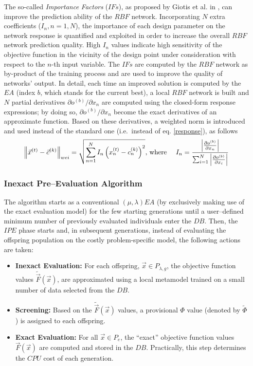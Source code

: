 The so-called \textit{Importance Factors} ($IFs$), as proposed by Giotis et al. in \cite{LTT_2_018}, can improve the prediction ability of the $RBF$ network. Incorporating $N$ extra coefficients ($I_n, n\!=\!1,N$), the importance of each design parameter on the network response is quantified and exploited in order to increase the overall $RBF$ network prediction quality. High $I_n$ values indicate high sensitivity of the objective function in the vicinity of the design point under consideration with respect to the $n$-th input variable. The $IFs$ are computed by the $RBF$ network as by-product of the training process and are used to improve the quality of networks' output. 
In detail, each time an improved solution is computed by the $EA$ (index $b$, which stands for the current best), a local $RBF$ network is built and $N$ partial derivatives $\partial o^{(b)} / \partial x_{n}$ are computed using the closed-form response expressions; by doing so, $\partial o^{(b)} / \partial x_{n}$ become the exact derivatives of an approximate function. 
Based on these derivatives, a weighted norm is introduced and used instead of the standard one (i.e.\ instead of eq. \ref{response}), as follows
%
\begin{equation}\label{e:IFcomp}
    \left\|\vec x^{(t)}-\vec c^{(k)}\right\|_{wei} =
    \sqrt{  \sum_{n=1}^N I_n\left(x_n^{(t)}-c_n^{(k)}\right)^2  }
	\mbox{,~where~~~~}
    I_n = { {\left|  {\partial o^{(b)}} \over {\partial x_n} \right|} 
          \over 
  { \sum_{i=1}^{N} \left| {\partial o^{(b)}} \over {\partial x_i} \right| } }
\end{equation}


\subsubsection{Inexact Pre--Evaluation Algorithm}


The algorithm starts as a conventional $(\mu, \lambda)EA$ (by exclusively making use of the exact evaluation model) for the few starting generations until a user--defined minimum number of previously evaluated individuals enter the $DB$. 
Then, the $IPE$ phase starts and, in subsequent generations, instead of evaluating the offspring population on the costly problem-specific model, the following actions are taken:
\newcommand{\apprx}[1]{\tilde{#1}}
\begin{itemize}
\item[]{\bf Inexact Evaluation:}
For each offspring, $\vec{x}\!\in\!P_{\lambda,g}$, the objective function values $\apprx{\vec{F}}(\vec{x})$, are approximated using a local metamodel trained on a small number of data selected from the $DB$. 
%
\item[]{\bf Screening:}
Based on the $\apprx{\vec{F}}(\vec{x})$ values, a provisional
$\Phi$ value (denoted by $\apprx{\Phi}$) is assigned to each
offspring.
\item[]{\bf Exact Evaluation:}
For all $\vec{x}\!\in\!P_{e}$, the ``exact'' objective function values $\vec{F}(\vec{x})$ are computed and stored in the $DB$. 
Practically, this step determines the $CPU$ cost of each generation.
\end{itemize}


